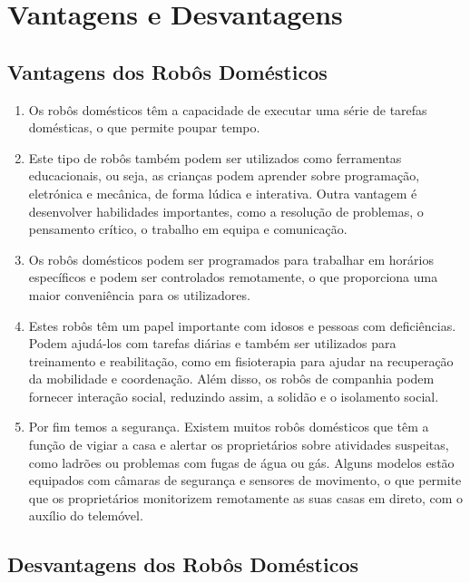 \documentclass[10pt]{article}
\begin{document}
\section{Vantagens e Desvantagens}
\subsection{Vantagens dos Robôs Domésticos\cite{advantages}}

\begin{enumerate}
    \item Os robôs domésticos têm a capacidade de executar uma série de tarefas domésticas, o que permite poupar tempo.
    \item Este tipo de robôs também podem ser utilizados como ferramentas educacionais, ou seja, as crianças podem aprender sobre programação, eletrónica e mecânica, de forma lúdica e interativa. Outra vantagem é desenvolver habilidades importantes, como a resolução de problemas, o pensamento crítico, o trabalho em equipa e comunicação.
    \item Os robôs domésticos podem ser programados para trabalhar em horários específicos e podem ser controlados remotamente, o que proporciona uma maior conveniência para os utilizadores.
    \item Estes robôs têm um papel importante com idosos e pessoas com deficiências. Podem ajudá-los com tarefas diárias e também ser utilizados para treinamento e reabilitação, como em fisioterapia para ajudar na recuperação da mobilidade e coordenação. Além disso, os robôs de companhia podem fornecer interação social, reduzindo assim, a solidão e o isolamento social. 
    \item Por fim temos a segurança. Existem muitos robôs domésticos que têm a função de vigiar a casa e alertar os proprietários sobre atividades suspeitas, como ladrões ou problemas com fugas de água ou gás. Alguns modelos estão equipados com câmaras de segurança e sensores de movimento, o que permite que os proprietários monitorizem remotamente as suas casas em direto, com o auxílio do telemóvel.
\end{enumerate}

\subsection{Desvantagens dos Robôs Domésticos\cite{advantages}}
\end{document}
